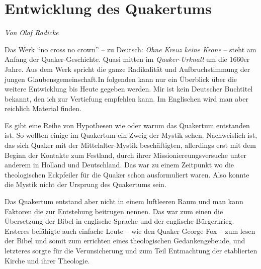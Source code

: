 




\chapter{Entwicklung des Quakertums}\label{ref:entwiklung_quakertum}


\begin{flushright}
\begin{footnotesize}
\textit{Von Olaf Radicke}
\end{footnotesize}
\end{flushright}
\smallskip 

Das Werk "`no cross no crown"' -- zu Deutsch: \textit{Ohne Kreuz keine Krone} --
steht am Anfang der Quaker-Geschichte. Quasi mitten im \textit{Quaker-Urknall}
um die 1660er Jahre. Aus dem Werk spricht die ganze Radikalität und
Aufbruchstimmung der jungen Glaubensgemeinschaft.In folgenden kann nur ein
Überblick über die weitere Entwicklung bis Heute gegeben werden. Mir ist kein
Deutscher Buchtitel bekannt, den ich zur Vertiefung empfehlen kann. Im
Englischen wird man aber reichlich Material finden.

\medskip

Es gibt eine Reihe von Hypothesen wie oder warum das Quakertum entstanden ist.
So
wollten einige im Quakertum ein Zweig der Mystik sehen. Nachweislich ist, das
sich Quaker mit der Mittelalter-Mystik beschäftigten, allerdings erst mit dem
Beginn der Kontakte zum Festland, durch ihrer Missioniereungsversuche unter
anderem in Holland und Deutschland. Das war zu einem Zeitpunkt wo die
theologischen Eckpfeiler für die Quaker schon ausformuliert waren. Also konnte
die Mystik nicht der Ursprung des Quakertums sein.

\medskip

Das Quakertum entstand aber nicht in einem luftleeren Raum und man kann Faktoren
die zur Entstehung beitrugen nennen. Das war zum einen die Übersetzung der Bibel
in englische Sprache und der englische Bürgerkrieg. Ersteres befähigte auch
einfache Leute -- wie den Quaker George Fox -- zum lesen der Bibel und somit zum
errichten eines theologischen Gedankengebeude, und letzteres sorgte für die
Verunsicherung und zum Teil Entmachtung der etablierten Kirche und ihrer
Theologie.

\medskip

